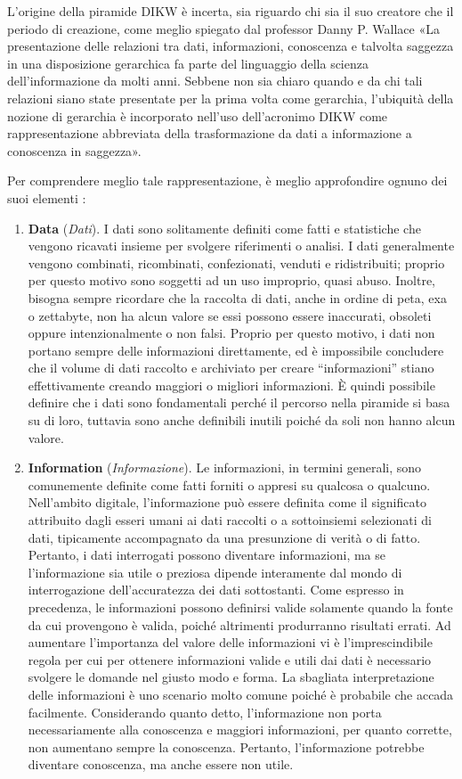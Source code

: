 L'origine della piramide DIKW è incerta, sia riguardo chi sia il suo creatore che il periodo di creazione, come meglio spiegato dal professor Danny P. Wallace \cite{knowledge_management_historical} «La presentazione delle relazioni tra dati, informazioni, conoscenza e talvolta saggezza in una disposizione gerarchica fa parte del linguaggio della scienza dell'informazione da molti anni. Sebbene non sia chiaro quando e da chi tali relazioni siano state presentate per la prima volta come gerarchia, l'ubiquità della nozione di gerarchia è incorporato nell'uso dell'acronimo DIKW come rappresentazione abbreviata della trasformazione da dati a informazione a conoscenza in saggezza».

Per comprendere meglio tale rappresentazione, è meglio approfondire ognuno dei suoi elementi \cite{researchgate_revising_dikw_pyramid}:
\begin{enumerate}
    \item \textbf{Data} (\textit{Dati}). I dati sono solitamente definiti come fatti e statistiche che vengono ricavati insieme per svolgere riferimenti o analisi. I dati generalmente vengono combinati, ricombinati, confezionati, venduti e ridistribuiti; proprio per questo motivo sono soggetti ad un uso improprio, quasi abuso. Inoltre, bisogna sempre ricordare che la raccolta di dati, anche in ordine di peta, exa o zettabyte, non ha alcun valore se essi possono essere inaccurati, obsoleti oppure intenzionalmente o non falsi. Proprio per questo motivo, i dati non portano sempre delle informazioni direttamente, ed è impossibile concludere che il volume di dati raccolto e archiviato per creare “informazioni” stiano effettivamente creando maggiori o migliori informazioni. È quindi possibile definire che i dati sono fondamentali perché il percorso nella piramide si basa su di loro, tuttavia sono anche definibili inutili poiché da soli non hanno alcun valore.
    \item \textbf{Information} (\textit{Informazione}). Le informazioni, in termini generali, sono comunemente definite come fatti forniti o appresi su qualcosa o qualcuno. Nell'ambito digitale, l'informazione può essere definita come il significato attribuito dagli esseri umani ai dati raccolti o a sottoinsiemi selezionati di dati, tipicamente accompagnato da una presunzione di verità o di fatto. Pertanto, i dati interrogati possono diventare informazioni, ma se l'informazione sia utile o preziosa dipende interamente dal mondo di interrogazione dell'accuratezza dei dati sottostanti. Come espresso in precedenza, le informazioni possono definirsi valide solamente quando la fonte da cui provengono è valida, poiché altrimenti produrranno risultati errati. Ad aumentare l'importanza del valore delle informazioni vi è l'imprescindibile regola per cui per ottenere informazioni valide e utili dai dati è necessario svolgere le domande nel giusto modo e forma. La sbagliata interpretazione delle informazioni è uno scenario molto comune poiché è probabile che accada facilmente. Considerando quanto detto, l'informazione non porta necessariamente alla conoscenza e maggiori informazioni, per quanto corrette, non aumentano sempre la conoscenza. Pertanto, l'informazione potrebbe diventare conoscenza, ma anche essere non utile.

\end{enumerate}
